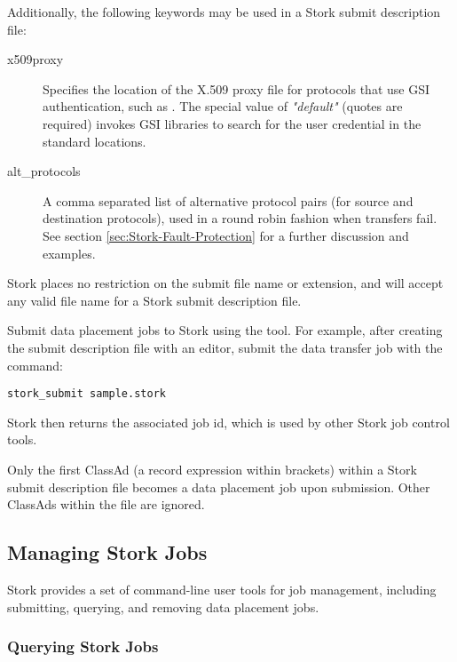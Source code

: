Additionally, the following keywords may be used in 
a Stork submit description file:

\begin{description}
    \item[x509proxy] Specifies the location of the
    X.509 proxy file for protocols
    that use GSI authentication, such as .
    The special value of \emph{"default"} (quotes are required) invokes
    GSI libraries to search for the user credential in the standard locations.

    \item[alt\_protocols] A comma separated list of
    alternative protocol pairs (for source and destination protocols),
    used in a round robin fashion
    when transfers fail.
    See section \ref{sec:Stork-Fault-Protection} for a further discussion
    and examples.


\end{description}

Stork places no restriction on the submit file name or extension, and will
accept any valid file name for a Stork submit description file.

Submit data placement jobs to Stork using the
 tool.
For example, after creating the submit description file
 with an
editor, submit the data transfer job with the command:

\begin{verbatim}
stork_submit sample.stork
\end{verbatim}

Stork then returns the associated job id, which is used by other Stork
job control tools.

Only the first ClassAd (a record expression within brackets) within 
a Stork submit description file becomes a data placement job
upon submission.
Other ClassAds within the file are ignored.

\subsection{\label{sec:Stork-Job-Management}Managing Stork Jobs}
Stork provides a set of command-line user tools for job management, including
submitting, querying, and removing data placement jobs.

\subsubsection{\label{sec:stork-query}Querying Stork Jobs}

